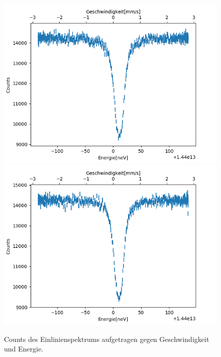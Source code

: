 \documentclass[12pt,a4paper]{article}
\begin{document}
\begin{figure}
\centering
\includegraphics[scale=0.49]{Bilder/Einlinien/Ein_Data_vor.png}
\includegraphics[scale=0.49]{Bilder/Einlinien/Ein_Data_nach.png}
\caption{Counts des Einlinienspektrums aufgetragen gegen Geschwindigkeit und Energie.}
\label{fig:Ein_Data}
\end{figure}
\end{document}
